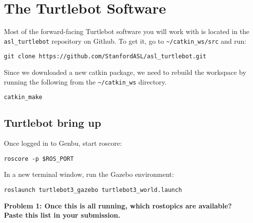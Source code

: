 \section{The Turtlebot Software}
Most of the forward-facing Turtlebot software you will work with is located in the \texttt{asl\_turtlebot} repository on Github. To get it, go to \texttt{\textasciitilde/catkin\_ws/src} and run:

\begin{lstlisting}
git clone https://github.com/StanfordASL/asl_turtlebot.git
\end{lstlisting}

Since we downloaded a new catkin package, we need to rebuild the workspace by running the following from the \texttt{\textasciitilde/catkin\_ws} directory.

\begin{lstlisting}
catkin_make
\end{lstlisting}

\subsection{Turtlebot bring up}
Once logged in to Genbu, start roscore:

\begin{lstlisting}
roscore -p $ROS_PORT
\end{lstlisting}

In a new terminal window, run the Gazebo environment:

\begin{lstlisting}
roslaunch turtlebot3_gazebo turtlebot3_world.launch
\end{lstlisting}

{\bf Problem 1: Once this is all running, which rostopics are available? Paste this list in your submission.}
